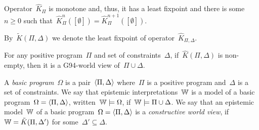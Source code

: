 \begin{conjecture}
    \label{conj:tp2.monotone}
    Operator~$\hat{K}_\Pi$ is monotone and, thus, it has a least fixpoint and there is some~$n \geq 0$ such that~$\hat{K}_\Pi^n([\emptyset]) = \hat{K}_\Pi^{n+1}([\emptyset])$.
\end{conjecture}

By~$\tilde{K}(\Pi,\Delta)$ we denote the least fixpoint of operator~$\hat{K}_{\Pi,\Delta}$.

\begin{conjecture}
    \label{conj:tp2.g94}
    For any positive program~$\Pi$ and set of constraints~$\Delta$, if~$\hat{K}(\Pi,\Delta)$ is non\nobreakdash-empty, then it is a G94-world view of~$\Pi \cup \Delta$.
\end{conjecture}

A \emph{basic program}~$\Omega$ is a pair~$\langle \Pi,\Delta \rangle$ where~$\Pi$ is a positive program and~$\Delta$ is a set of constraints.
%
We say that epistemic interpretations~$\mathbb{W}$ is a model of a basic program~$\Omega = \langle \Pi,\Delta \rangle$, written~$\mathbb{W} \models \Omega$, if~$\mathbb{W} \models \Pi \cup \Delta$.
%
We say that an epistemic model~$\mathbb{W}$ of a basic program~$\Omega = \langle \Pi,\Delta \rangle$ is a \emph{constructive world view}, if~$\mathbb{W} = \tilde{K}(\Pi,\Delta')$ for some~$\Delta' \subseteq \Delta$.